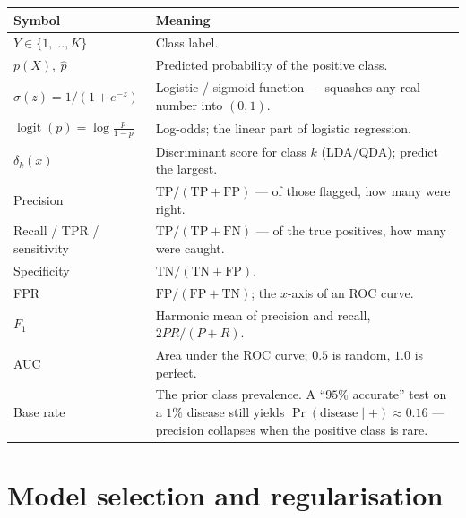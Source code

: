 \documentclass[10pt,letterpaper,onecolumn]{article}
\makeatletter
\newenvironment{symtab}
  {\begin{longtable}{@{}>{\raggedright\arraybackslash}p{0.26\textwidth}%
                       >{\raggedright\arraybackslash}p{0.70\textwidth}@{}}
   \toprule
   \textbf{Symbol} & \textbf{Meaning} \\
   \midrule
   \endhead
   \bottomrule
   \endfoot}
  {\end{longtable}}
\makeatother
\begin{document}
\begin{symtab}
$Y \in \{1,\dots,K\}$ & Class label. \\
$p(X),\ \hat p$ & Predicted probability of the positive class. \\
$\sigma(z) = 1/(1+e^{-z})$ & Logistic / sigmoid function — squashes any real number into $(0,1)$. \\
$\operatorname{logit}(p) = \log\frac{p}{1-p}$ & Log-odds; the linear part of logistic regression. \\
$\delta_k(x)$ & Discriminant score for class $k$ (LDA/QDA); predict the largest. \\
Precision & $\mathrm{TP}/(\mathrm{TP}+\mathrm{FP})$ — of those flagged, how many were right. \\
Recall / TPR / sensitivity & $\mathrm{TP}/(\mathrm{TP}+\mathrm{FN})$ — of the true positives, how many were caught. \\
Specificity & $\mathrm{TN}/(\mathrm{TN}+\mathrm{FP})$. \\
FPR & $\mathrm{FP}/(\mathrm{FP}+\mathrm{TN})$; the $x$-axis of an ROC curve. \\
$F_1$ & Harmonic mean of precision and recall, $2PR/(P+R)$. \\
AUC & Area under the ROC curve; $0.5$ is random, $1.0$ is perfect. \\
Base rate & The prior class prevalence. A ``$95\%$ accurate'' test on a $1\%$ disease still yields $\Pr(\text{disease}\mid+)\approx 0.16$ — precision collapses when the positive class is rare. \\
\end{symtab}

\section{Model selection and regularisation}
\label{sec:modelsel}
\end{document}
